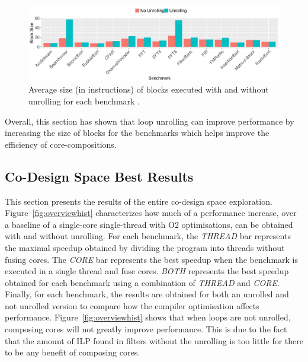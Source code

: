 \begin{figure}[t]
  \includegraphics[width=1\textwidth]{streamit-paper/graphics/unrolling_size.pdf}
  \caption{Average size (in instructions) of blocks executed with and without unrolling for each benchmark .}\label{fig:unroll_size}
\end{figure}

Overall, this section has shown that loop unrolling can improve performance by increasing the size of blocks for the benchmarks which helps improve the efficiency of core-compositions.

\subsection{Co-Design Space Best Results}


This section  presents the results of the entire co-design space exploration.
Figure~\ref{fig:overviewhist} characterizes how much of a performance increase, over a baseline of a single-core single-thread with O2 optimisations, can be obtained with and without unrolling.
For each benchmark, the \textit{THREAD} bar represents the maximal speedup obtained by dividing the program into threads without fusing cores.
The \textit{CORE} bar represents the best speedup when the benchmark is executed in a single thread and fuse cores.
\textit{BOTH} represents the best speedup obtained for each benchmark using a combination of \textit{THREAD} and \textit{CORE}.
Finally, for each benchmark, the results are obtained for both an unrolled and not unrolled version to compare how the compiler optimisation affects performance.
Figure~\ref{fig:overviewhist} shows that when loops are not unrolled, composing cores will not greatly improve performance.
This is due to the fact that the amount of ILP found in filters without the unrolling is too little for there to be any benefit of composing cores.

